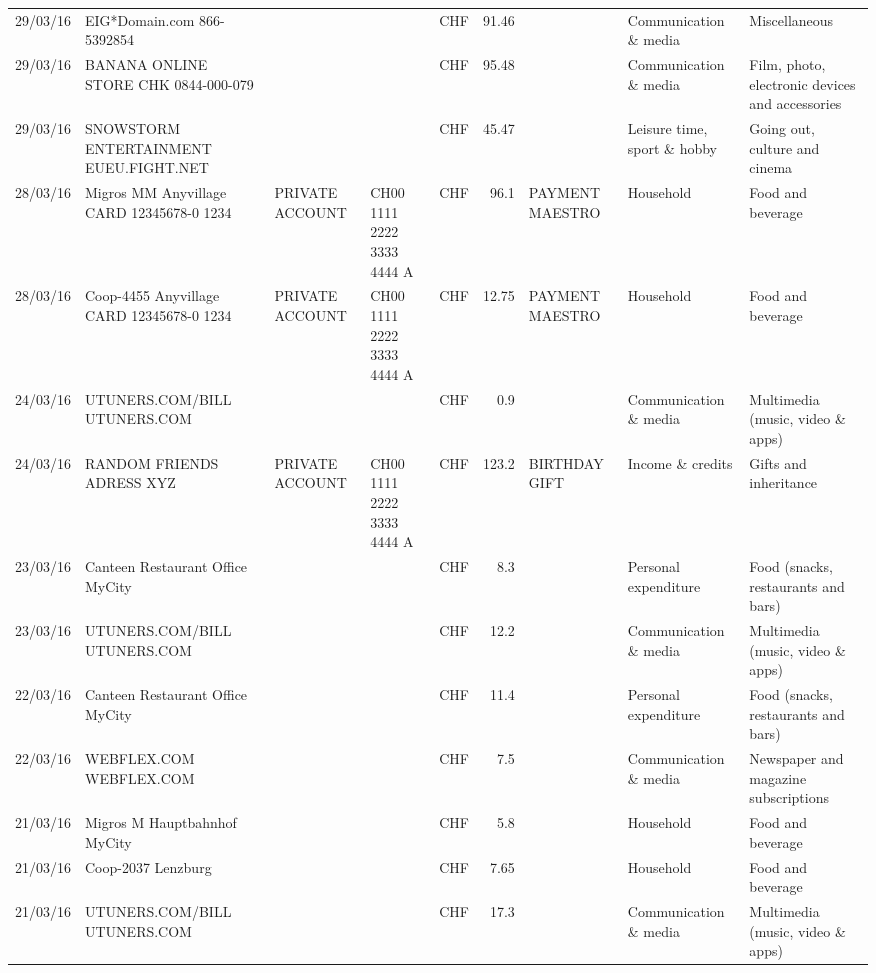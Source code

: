 \begin{landscape}
\begin{table}[h]
\begin{center}
\begin{tabular}{rllllrlll}
		29/03/16 & EIG*Domain.com           866-5392854 &       &       & CHF   & 91.46 &       & Communication \& media & Miscellaneous \\
		29/03/16 & BANANA ONLINE STORE CHK   0844-000-079 &       &       & CHF   & 95.48 &       & Communication \& media & Film, photo, electronic devices and accessories \\
		29/03/16 & SNOWSTORM ENTERTAINMENT EUEU.FIGHT.NET &       &       & CHF   & 45.47 &       & Leisure time, sport \& hobby & Going out, culture and cinema \\
		28/03/16 & Migros MM Anyvillage CARD 12345678-0 1234 & PRIVATE ACCOUNT & CH00 1111 2222 3333 4444 A & CHF   & 96.1  & PAYMENT MAESTRO & Household & Food and beverage \\
		28/03/16 & Coop-4455 Anyvillage CARD 12345678-0 1234 & PRIVATE ACCOUNT & CH00 1111 2222 3333 4444 A & CHF   & 12.75 & PAYMENT MAESTRO & Household & Food and beverage \\
		24/03/16 & UTUNERS.COM/BILL          UTUNERS.COM &       &       & CHF   & 0.9   &       & Communication \& media & Multimedia (music, video \& apps) \\
		24/03/16 & RANDOM FRIENDS ADRESS XYZ & PRIVATE ACCOUNT & CH00 1111 2222 3333 4444 A & CHF   & 123.2 & BIRTHDAY GIFT & Income \& credits & Gifts and inheritance \\
		23/03/16 & Canteen Restaurant Office      MyCity &       &       & CHF   & 8.3   &       & Personal expenditure & Food (snacks, restaurants and bars) \\
		23/03/16 & UTUNERS.COM/BILL          UTUNERS.COM &       &       & CHF   & 12.2  &       & Communication \& media & Multimedia (music, video \& apps) \\
		22/03/16 & Canteen Restaurant Office      MyCity &       &       & CHF   & 11.4  &       & Personal expenditure & Food (snacks, restaurants and bars) \\
		22/03/16 & WEBFLEX.COM              WEBFLEX.COM &       &       & CHF   & 7.5   &       & Communication \& media & Newspaper and magazine subscriptions \\
		21/03/16 & Migros M Hauptbahnhof    MyCity &       &       & CHF   & 5.8   &       & Household & Food and beverage \\
		21/03/16 & Coop-2037                Lenzburg &       &       & CHF   & 7.65  &       & Household & Food and beverage \\
		21/03/16 & UTUNERS.COM/BILL          UTUNERS.COM &       &       & CHF   & 17.3  &       & Communication \& media & Multimedia (music, video \& apps) \\

\end{tabular}
\end{center}
\end{table}
\end{landscape}
